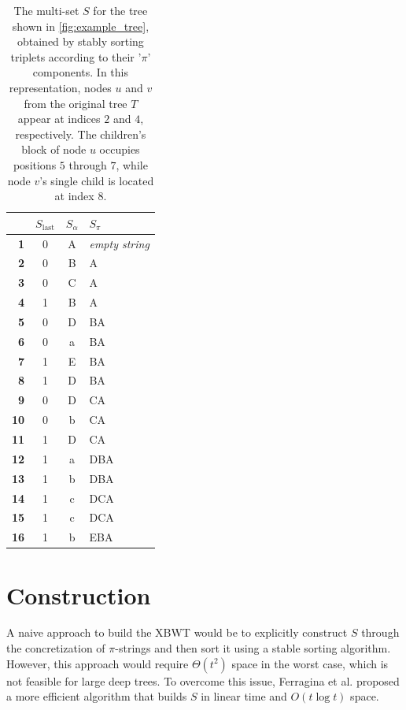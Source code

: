 \begin{table}[H]
    \centering
    \begin{tabular}{r c c l}
    \hline\hline
    \textbf{} & \textbf{$S_{\text{last}}$} & \textbf{$S_{\alpha}$} & \textbf{$S_{\pi}$} \\
    \hline
    \textbf{1} & 0 & A & \textit{empty string} \\
    \textbf{2} & 0 & B & A \\
    \textbf{3} & 0 & C & A \\
    \textbf{4} & 1 & B & A \\
    \textbf{5} & 0 & D & BA \\
    \textbf{6} & 0 & a & BA \\
    \textbf{7} & 1 & E & BA \\
    \textbf{8} & 1 & D & BA \\
    \textbf{9} & 0 & D & CA \\
    \textbf{10} & 0 & b & CA \\
    \textbf{11} & 1 & D & CA \\
    \textbf{12} & 1 & a & DBA \\
    \textbf{13} & 1 & b & DBA \\
    \textbf{14} & 1 & c & DCA \\
    \textbf{15} & 1 & c & DCA \\
    \textbf{16} & 1 & b & EBA \\
    \hline\hline
    \end{tabular}
    \caption{The multi-set $S$ for the tree shown in \cref{fig:example_tree}, obtained by stably sorting triplets according to their '$\pi$' components. In this representation, nodes $u$ and $v$ from the original tree $T$ appear at indices $2$ and $4$, respectively. The children's block of node $u$ occupies positions $5$ through $7$, while node $v$'s single child is located at index $8$.}
    \label{tab:xbwt_example}
\end{table}

\section{Construction}
A naive approach to build the XBWT would be to explicitly construct $S$ through the concretization of $\pi$-strings and then sort it using a stable sorting algorithm. However, this approach would require $\Theta(t^2)$ space in the worst case, which is not feasible for large deep trees. To overcome this issue, Ferragina et al. \cite{ferragina2009compressing} proposed a more efficient algorithm that builds $S$ in linear time and $O(t \log t)$ space.

